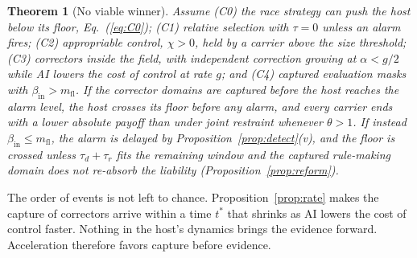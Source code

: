\documentclass[letterpaper]{article} %
\newtheorem{theorem}{Theorem}
\theoremstyle{definition}
\newcommand{\mfl}{m_{\mathrm{fl}}}
\begin{document}
\begin{theorem}[No viable winner]\label{thm:fail}
Assume (C0) the race strategy can push the host below its floor, Eq.~(\ref{eq:C0}); (C1) relative selection with $\tau=0$ unless an alarm fires; (C2) appropriable control, $\chi>0$, held by a carrier above the size threshold; (C3) correctors inside the field, with independent correction growing at $\alpha<g/2$ while AI lowers the cost of control at rate $g$; and (C4) captured evaluation masks with $\beta_{\mathrm{in}}>\mfl$. If the corrector domains are captured before the host reaches the alarm level, the host crosses its floor before any alarm, and every carrier ends with a lower absolute payoff than under joint restraint whenever $\theta>1$. If instead $\beta_{\mathrm{in}}\le\mfl$, the alarm is delayed by Proposition~\ref{prop:detect}(v), and the floor is crossed unless $\tau_d+\tau_r$ fits the remaining window and the captured rule-making domain does not re-absorb the liability (Proposition~\ref{prop:reform}).
\end{theorem}

The order of events is not left to chance. Proposition~\ref{prop:rate} makes the capture of correctors arrive within a time $t^\ast$ that shrinks as AI lowers the cost of control faster. Nothing in the host's dynamics brings the evidence forward. Acceleration therefore favors capture before evidence.
\end{document}
